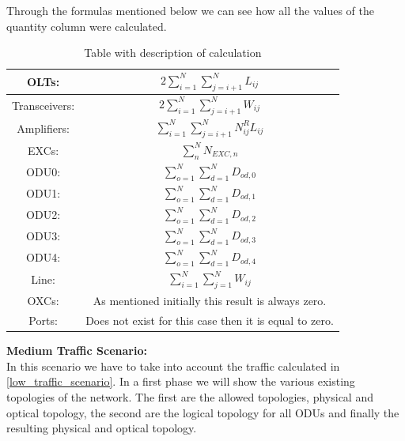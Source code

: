 Through the formulas mentioned below we can see how all the values of the quantity column were calculated.

\begin{table}[H]
\centering
\begin{tabular}{|| c | c ||}
 \hline
 OLTs: & \(\displaystyle 2 \sum_{i=1}^{N}\sum_{j=i+1}^{N} L_{ij} \) \\ \hline
 Transceivers: & \(\displaystyle 2 \sum_{i=1}^{N}\sum_{j=i+1}^{N} W_{ij} \) \\ \hline
 Amplifiers: & \(\displaystyle \sum_{i=1}^{N}\sum_{j=i+1}^{N} N^R_{ij} L_{ij} \) \\ \hline
 EXCs: & \(\displaystyle \sum_n^N N_{EXC,n} \) \\ \hline
 ODU0: & \(\displaystyle \sum_{o=1}^{N}\sum_{d=1}^{N} D_{od,0} \) \\ \hline
 ODU1: & \(\displaystyle \sum_{o=1}^{N}\sum_{d=1}^{N} D_{od,1} \) \\ \hline
 ODU2: & \(\displaystyle \sum_{o=1}^{N}\sum_{d=1}^{N} D_{od,2} \)\\ \hline
 ODU3: & \(\displaystyle \sum_{o=1}^{N}\sum_{d=1}^{N} D_{od,3} \) \\ \hline
 ODU4: & \(\displaystyle \sum_{o=1}^{N}\sum_{d=1}^{N} D_{od,4} \) \\ \hline
 Line: & \(\displaystyle \sum_{i=1}^{N}\sum_{j=1}^{N} W_{ij} \) \\ \hline
 OXCs: & As mentioned initially this result is always zero. \\ \hline
 Ports: & Does not exist for this case then it is equal to zero. \\
 \hline
 \end{tabular}
\caption{Table with description of calculation}
\label{formulas_opaque_surv_ref_low_heuristic}
\end{table}

\newpage
\textbf{Medium Traffic Scenario:}\\

In this scenario we have to take into account the traffic calculated in \ref{low_traffic_scenario}. In a first phase we will show the various existing topologies of the network. The first are the allowed topologies, physical and optical topology, the second are the logical topology for all ODUs and finally the resulting physical and optical topology.\\


